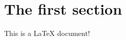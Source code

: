 \documentclass[12pt]{article}
\begin{document}
\section{The first section}

This is a \LaTeX{} document!
\end{document}

